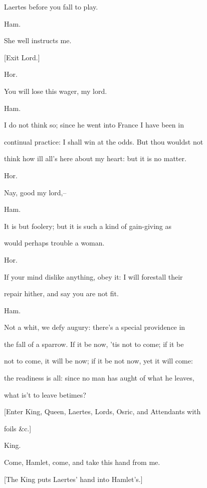 \documentclass[12pt]{book}
\begin{document}
Laertes before you fall to play.



Ham.

She well instructs me.



[Exit Lord.]



Hor.

You will lose this wager, my lord.



Ham.

I do not think so; since he went into France I have been in

continual practice: I shall win at the odds. But thou wouldst not

think how ill all's here about my heart: but it is no matter.



Hor.

Nay, good my lord,--



Ham.

It is but foolery; but it is such a kind of gain-giving as

would perhaps trouble a woman.



Hor.

If your mind dislike anything, obey it: I will forestall their

repair hither, and say you are not fit.



Ham.

Not a whit, we defy augury: there's a special providence in

the fall of a sparrow. If it be now, 'tis not to come; if it be

not to come, it will be now; if it be not now, yet it will come:

the readiness is all: since no man has aught of what he leaves,

what is't to leave betimes?



[Enter King, Queen, Laertes, Lords, Osric, and Attendants with

foils \&c.]



King.

Come, Hamlet, come, and take this hand from me.



[The King puts Laertes' hand into Hamlet's.]
\end{document}
